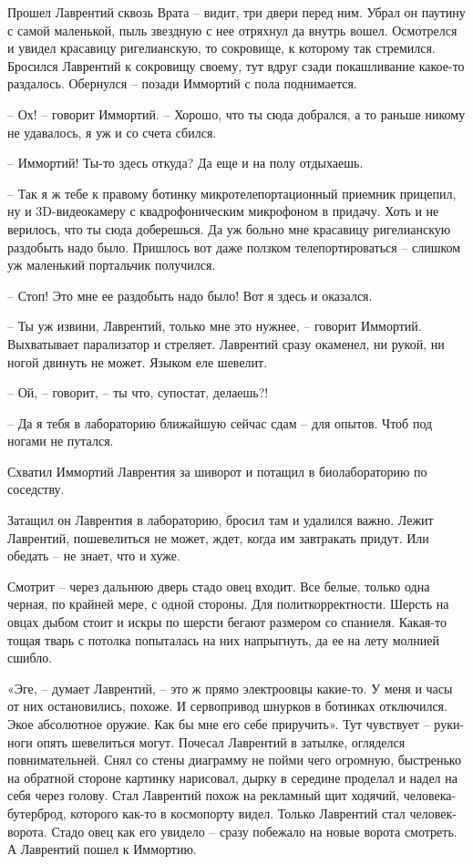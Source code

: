\documentclass[ebook,oneside,final,openright]{memoir}
\begin{document}
\par
\par
Прошел Лаврентий сквозь Врата – видит, три двери перед ним. Убрал он паутину с самой маленькой, пыль звездную с нее отряхнул да внутрь вошел. Осмотрелся и увидел красавицу ригелианскую, то сокровище, к которому так стремился. Бросился Лаврентий к сокровищу своему, тут вдруг сзади покашливание какое-то раздалось. Обернулся – позади Иммортий с пола поднимается.\par
– Ох! – говорит Иммортий. – Хорошо, что ты сюда добрался, а то раньше никому не удавалось, я уж и со счета сбился.\par
– Иммортий! Ты-то здесь откуда? Да еще и на полу отдыхаешь.\par
– Так я ж тебе к правому ботинку микротелепортационный приемник прицепил, ну и 3D-видеокамеру с квадрофоническим микрофоном в придачу. Хоть и не верилось, что ты сюда доберешься. Да уж больно мне красавицу ригелианскую раздобыть надо было. Пришлось вот даже ползком телепортироваться – слишком уж маленький портальчик получился.\par
– Стоп! Это мне ее раздобыть надо было! Вот я здесь и оказался.\par
– Ты уж извини, Лаврентий, только мне это нужнее, – говорит Иммортий. Выхватывает парализатор и стреляет. Лаврентий сразу окаменел, ни рукой, ни ногой двинуть не может. Языком еле шевелит.\par
– Ой, – говорит, – ты что, супостат, делаешь?!\par
– Да я тебя в лабораторию ближайшую сейчас сдам – для опытов. Чтоб под ногами не путался.\par
Схватил Иммортий Лаврентия за шиворот и потащил в биолабораторию по соседству.\par
\par
Затащил он Лаврентия в лабораторию, бросил там и удалился важно. Лежит Лаврентий, пошевелиться не может, ждет, когда им завтракать придут. Или обедать – не знает, что и хуже. \par
Смотрит – через дальнюю дверь стадо овец входит. Все белые, только одна черная, по крайней мере, с одной стороны. Для политкорректности. Шерсть на овцах дыбом стоит и искры по шерсти бегают размером со спаниеля. Какая-то тощая тварь с потолка попыталась на них напрыгнуть, да ее на лету молнией сшибло.\par
\par
«Эге, – думает Лаврентий, – это ж прямо электроовцы какие-то. У меня и часы от них остановились, похоже. И сервопривод шнурков в ботинках отключился. Экое абсолютное оружие. Как бы мне его себе приручить». Тут чувствует – руки-ноги опять шевелиться могут. Почесал Лаврентий в затылке, огляделся повнимательней. Снял со стены диаграмму не пойми чего огромную, быстренько на обратной стороне картинку нарисовал, дырку в середине проделал и надел на себя через голову. Стал Лаврентий похож на рекламный щит ходячий, человека-бутерброд, которого как-то в космопорту видел. Только Лаврентий стал человек-ворота. Стадо овец как его увидело – сразу побежало на новые ворота смотреть. А Лаврентий пошел к Иммортию.\par
\end{document}
